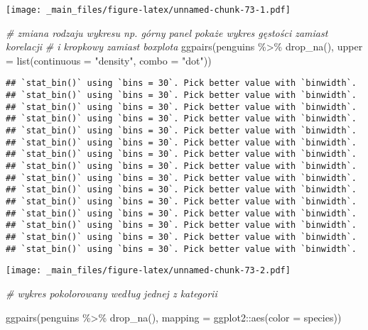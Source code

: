 \documentclass[
]{book}
\newenvironment{Shaded}{\begin{snugshade}}{\end{snugshade}}
\newcommand{\AttributeTok}[1]{\textcolor[rgb]{0.77,0.63,0.00}{#1}}
\newcommand{\CommentTok}[1]{\textcolor[rgb]{0.56,0.35,0.01}{\textit{#1}}}
\newcommand{\FunctionTok}[1]{\textcolor[rgb]{0.00,0.00,0.00}{#1}}
\newcommand{\NormalTok}[1]{#1}
\newcommand{\SpecialCharTok}[1]{\textcolor[rgb]{0.00,0.00,0.00}{#1}}
\newcommand{\StringTok}[1]{\textcolor[rgb]{0.31,0.60,0.02}{#1}}
\begin{document}
\texttt{[image: \_main\_files/figure-latex/unnamed-chunk-73-1.pdf]}

\begin{Shaded}
\begin{Highlighting}[]
\CommentTok{\# zmiana rodzaju wykresu np. górny panel pokaże wykres gęstości zamiast korelacji  }
\CommentTok{\# i kropkowy zamiast boxplota}
\FunctionTok{ggpairs}\NormalTok{(penguins }\SpecialCharTok{\%\textgreater{}\%} \FunctionTok{drop\_na}\NormalTok{(), }\AttributeTok{upper =} \FunctionTok{list}\NormalTok{(}\AttributeTok{continuous =} \StringTok{"density"}\NormalTok{, }\AttributeTok{combo =} \StringTok{"dot"}\NormalTok{))}
\end{Highlighting}
\end{Shaded}

\begin{verbatim}
## `stat_bin()` using `bins = 30`. Pick better value with `binwidth`.
## `stat_bin()` using `bins = 30`. Pick better value with `binwidth`.
## `stat_bin()` using `bins = 30`. Pick better value with `binwidth`.
## `stat_bin()` using `bins = 30`. Pick better value with `binwidth`.
## `stat_bin()` using `bins = 30`. Pick better value with `binwidth`.
## `stat_bin()` using `bins = 30`. Pick better value with `binwidth`.
## `stat_bin()` using `bins = 30`. Pick better value with `binwidth`.
## `stat_bin()` using `bins = 30`. Pick better value with `binwidth`.
## `stat_bin()` using `bins = 30`. Pick better value with `binwidth`.
## `stat_bin()` using `bins = 30`. Pick better value with `binwidth`.
## `stat_bin()` using `bins = 30`. Pick better value with `binwidth`.
## `stat_bin()` using `bins = 30`. Pick better value with `binwidth`.
## `stat_bin()` using `bins = 30`. Pick better value with `binwidth`.
## `stat_bin()` using `bins = 30`. Pick better value with `binwidth`.
## `stat_bin()` using `bins = 30`. Pick better value with `binwidth`.
\end{verbatim}

\texttt{[image: \_main\_files/figure-latex/unnamed-chunk-73-2.pdf]}

\begin{Shaded}
\begin{Highlighting}[]
\CommentTok{\# wykres pokolorowany według jednej z kategorii}

\FunctionTok{ggpairs}\NormalTok{(penguins }\SpecialCharTok{\%\textgreater{}\%} \FunctionTok{drop\_na}\NormalTok{(), }\AttributeTok{mapping =}\NormalTok{ ggplot2}\SpecialCharTok{::}\FunctionTok{aes}\NormalTok{(}\AttributeTok{color =}\NormalTok{ species))}
\end{Highlighting}
\end{Shaded}
\end{document}
